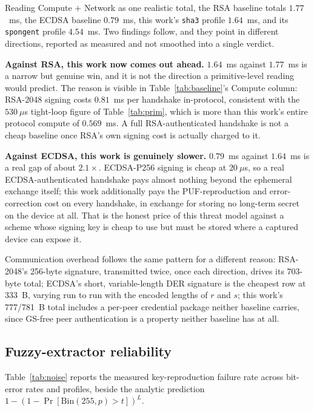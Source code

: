 \documentclass[journal]{IEEEtran}
\begin{document}
Reading Compute $+$ Network as one realistic total, the RSA baseline totals
$1.77$~ms, the ECDSA baseline $0.79$~ms, this work's \texttt{sha3} profile
$1.64$~ms, and its \texttt{spongent} profile $4.54$~ms. Two findings follow,
and they point in different directions, reported as measured and not smoothed
into a single verdict.

\textbf{Against RSA, this work now comes out ahead.} $1.64$~ms against
$1.77$~ms is a narrow but genuine win, and it is not the direction a
primitive-level reading would predict. The reason is visible in
Table~\ref{tab:baseline}'s Compute column: RSA-2048 signing costs
$0.81$~ms per handshake in-protocol, consistent with the $530~\mu$s
tight-loop figure of Table~\ref{tab:prim}, which is more than this work's
entire protocol compute of $0.569$~ms. A full RSA-authenticated handshake is
not a cheap baseline once RSA's own signing cost is actually charged to it.

\textbf{Against ECDSA, this work is genuinely slower.} $0.79$~ms against
$1.64$~ms is a real gap of about $2.1\times$. ECDSA-P256 signing is cheap at
$20~\mu$s, so a real ECDSA-authenticated handshake pays almost nothing beyond
the ephemeral exchange itself; this work additionally pays the PUF-reproduction
and error-correction cost on every handshake, in exchange for storing no
long-term secret on the device at all. That is the honest price of this threat
model against a scheme whose signing key is cheap to use but must be stored
where a captured device can expose it.

Communication overhead follows the same pattern for a different reason:
RSA-2048's 256-byte signature, transmitted twice, once each direction, drives
its 703-byte total; ECDSA's short, variable-length DER signature is the
cheapest row at 333~B, varying run to run with the encoded lengths of
$r$ and $s$; this work's 777/781~B total includes a per-peer credential
package neither baseline carries, since GS-free peer authentication is a
property neither baseline has at all.

\subsection{Fuzzy-extractor reliability}
\label{sec:reliability}

Table~\ref{tab:noise} reports the measured key-reproduction failure rate across
bit-error rates and profiles, beside the analytic prediction
$1-(1-\Pr[\mathrm{Bin}(255,p)>t])^{L}$.
\end{document}
